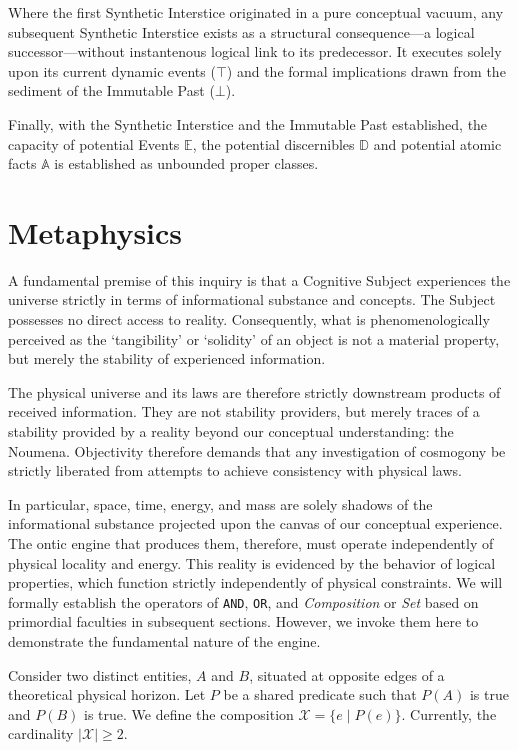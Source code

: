\documentclass[11pt, a4paper]{article}
\theoremstyle{formalism}
\begin{document}
Where the first Synthetic Interstice originated in a pure conceptual vacuum,
any subsequent Synthetic Interstice exists as a structural consequence---a
logical successor---without instantenous logical link to its predecessor. It
executes solely upon its current dynamic events ($\top$) and the formal
implications drawn from the sediment of the Immutable Past ($\bot$).

Finally, with the Synthetic Interstice and the Immutable Past established, the 
capacity of potential Events $\mathbb{E}$, the potential discernibles
$\mathbb{D}$ and potential atomic facts $\mathbb{A}$ is established as 
unbounded proper classes.

\section{Metaphysics}


A fundamental premise of this inquiry is that a Cognitive Subject experiences
the universe strictly in terms of informational substance and concepts. The
Subject possesses no direct access to reality. Consequently, what is
phenomenologically perceived as the `tangibility' or `solidity' of an object is
not a material property, but merely the stability of experienced information.

The physical universe and its laws are therefore strictly downstream products
of received information. They are not stability providers, but merely traces
of a stability provided by a reality beyond our conceptual understanding: the
Noumena. Objectivity therefore demands that any investigation of cosmogony be
strictly liberated from attempts to achieve consistency with physical laws.

In particular, space, time, energy, and mass are solely shadows of the
informational substance projected upon the canvas of our conceptual experience.
The ontic engine that produces them, therefore, must operate
independently of physical locality and energy. This reality is evidenced by the
behavior of logical properties, which function strictly independently of
physical constraints. We will formally establish the operators of \texttt{AND},
\texttt{OR}, and \textit{Composition} or \textit{Set} based on primordial
faculties in subsequent sections. However, we invoke them here to demonstrate
the fundamental nature of the engine.

Consider two distinct entities, $A$ and $B$, situated at opposite edges of a
theoretical physical horizon. Let $P$ be a shared predicate such that $P(A)$
is true and $P(B)$ is true. We define the composition $\mathcal{X} = \{ e \mid P(e) \}$.
Currently, the cardinality $|\mathcal{X}| \ge 2$.
\end{document}
